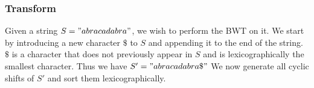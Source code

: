 \documentclass{article}
\begin{document}
\subsubsection{Transform}
Given a string \(S = "abracadabra"\), we wish to perform the BWT on it. We start by introducing a new character \(\$\) to \(S\) and appending it to the end of the string. \(\$\) is a character that does not previously appear in \(S\) and is lexicographically the smallest character. Thus we have \(S' = "abracadabra\$"\) %
We now generate all cyclic shifts of \(S'\) and sort them lexicographically.
\iffalse
    {\footnotesize \setlength{\jot}{1pt} %
     \begin{align*}
        abracadabra\$ \\
        bracadabra\$a \\
        racadabra\$ab \\
        acadabra\$abr \\
        cadabra\$abra \\
        adabra\$abrac \\
        dabra\$abraca \\
        abra\$abracad \\
        bra\$abracada \\
        ra\$abracadab \\
        a\$abracadaba \\
        \$abracadabaa
    \end{align*}}
\fi
\end{document}
